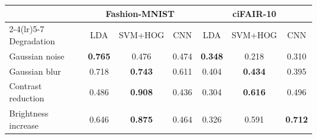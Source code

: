 \begin{tabular}{lcccccc}
\toprule
 & \multicolumn{3}{c}{Fashion-MNIST} & \multicolumn{3}{c}{ciFAIR-10} \\
\cmidrule(lr){2-4}\cmidrule(lr){5-7}
Degradation & LDA & SVM+HOG & CNN & LDA & SVM+HOG & CNN \\
\midrule
Gaussian noise & \textbf{0.765} & 0.476 & 0.474 & \textbf{0.348} & 0.218 & 0.310 \\
Gaussian blur & 0.718 & \textbf{0.743} & 0.611 & 0.404 & \textbf{0.434} & 0.395 \\
Contrast reduction & 0.486 & \textbf{0.908} & 0.436 & 0.304 & \textbf{0.616} & 0.496 \\
Brightness increase & 0.646 & \textbf{0.875} & 0.464 & 0.326 & 0.591 & \textbf{0.712} \\
\bottomrule
\end{tabular}
